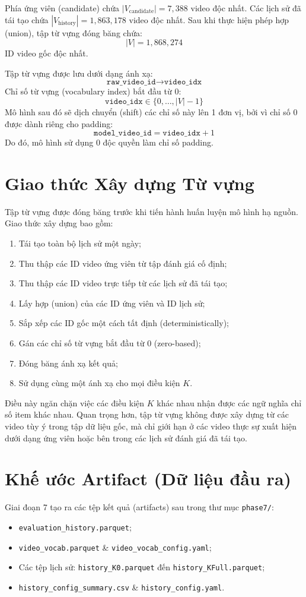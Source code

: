 \documentclass[12pt,a4paper]{article}
\begin{document}
Phía ứng viên (candidate) chứa $|V_{\mathrm{candidate}}| = 7{,}388$ video độc nhất. Các lịch sử đã tái tạo chứa $|V_{\mathrm{history}}| = 1{,}863{,}178$ video độc nhất.
Sau khi thực hiện phép hợp (union), tập từ vựng đóng băng chứa:
\[
|V| = 1{,}868{,}274
\]
ID video gốc độc nhất.

Tập từ vựng được lưu dưới dạng ánh xạ:
\[
\texttt{raw\_video\_id} \longrightarrow \texttt{video\_idx}
\]
Chỉ số từ vựng (vocabulary index) bắt đầu từ 0:
\[
\texttt{video\_idx} \in \{0, \ldots, |V|-1\}
\]
Mô hình sau đó sẽ dịch chuyển (shift) các chỉ số này lên 1 đơn vị, bởi vì chỉ số 0 được dành riêng cho padding:
\[
\texttt{model\_video\_id} = \texttt{video\_idx} + 1
\]
Do đó, mô hình sử dụng $0$ độc quyền làm chỉ số padding.

\section{Giao thức Xây dựng Từ vựng}
Tập từ vựng được đóng băng trước khi tiến hành huấn luyện mô hình hạ nguồn. Giao thức xây dựng bao gồm:
\begin{enumerate}[noitemsep]
    \item Tái tạo toàn bộ lịch sử một ngày;
    \item Thu thập các ID video ứng viên từ tập đánh giá cố định;
    \item Thu thập các ID video trực tiếp từ các lịch sử đã tái tạo;
    \item Lấy hợp (union) của các ID ứng viên và ID lịch sử;
    \item Sắp xếp các ID gốc một cách tất định (deterministically);
    \item Gán các chỉ số từ vựng bắt đầu từ 0 (zero-based);
    \item Đóng băng ánh xạ kết quả;
    \item Sử dụng cùng một ánh xạ cho mọi điều kiện $K$.
\end{enumerate}

Điều này ngăn chặn việc các điều kiện $K$ khác nhau nhận được các ngữ nghĩa chỉ số item khác nhau. Quan trọng hơn, tập từ vựng không được xây dựng từ các video tùy ý trong tập dữ liệu gốc, mà chỉ giới hạn ở các video thực sự xuất hiện dưới dạng ứng viên hoặc bên trong các lịch sử đánh giá đã tái tạo.

\section{Khế ước Artifact (Dữ liệu đầu ra)}
Giai đoạn 7 tạo ra các tệp kết quả (artifacts) sau trong thư mục \texttt{phase7/}:
\begin{itemize}[noitemsep]
    \item \texttt{evaluation\_history.parquet};
    \item \texttt{video\_vocab.parquet} \& \texttt{video\_vocab\_config.yaml};
    \item Các tệp lịch sử: \texttt{history\_K0.parquet} đến \texttt{history\_KFull.parquet};
    \item \texttt{history\_config\_summary.csv} \& \texttt{history\_config.yaml}.
\end{itemize}
\end{document}
